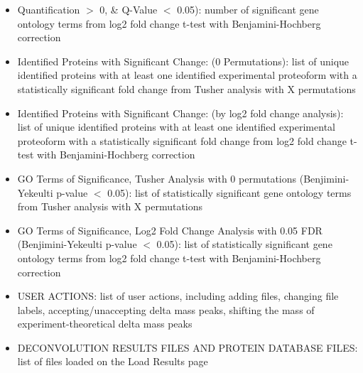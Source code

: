 \begin{itemize}
\begin{itemize}
\item Quantification $>$ 0, \& Q-Value $<$ 0.05): number of significant gene ontology terms from log2 fold change t-test with Benjamini-Hochberg correction
\item Identified Proteins with Significant Change: (0 Permutations): list of unique identified proteins with at least one identified experimental proteoform with a statistically significant fold change from Tusher analysis with X permutations
\item Identified Proteins with Significant Change: (by log2 fold change analysis): list of unique identified proteins with at least one identified experimental proteoform with a statistically significant fold change from log2 fold change t-test with Benjamini-Hochberg correction
\item GO Terms of Significance, Tusher Analysis with 0 permutations (Benjimini-Yekeulti p-value $<$ 0.05): list of statistically significant gene ontology terms from Tusher analysis with X permutations
\item GO Terms of Significance, Log2 Fold Change Analysis with 0.05 FDR (Benjimini-Yekeulti p-value $<$ 0.05): list of statistically significant gene ontology terms from log2 fold change t-test with Benjamini-Hochberg correction
\item USER ACTIONS: list of user actions, including adding files, changing file labels, accepting/unaccepting delta mass peaks, shifting the mass of experiment-theoretical delta mass peaks
\item DECONVOLUTION RESULTS FILES AND PROTEIN DATABASE FILES: list of files loaded on the Load Results page
\end{itemize}
\end{itemize}


